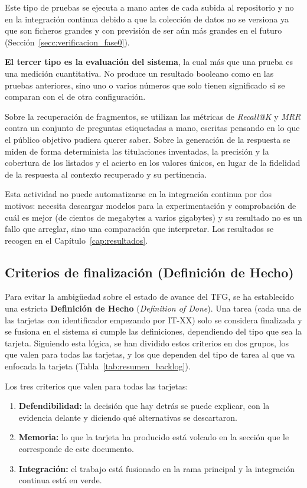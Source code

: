 Este tipo de pruebas se ejecuta a mano antes de cada subida al repositorio y no en la integración continua debido a que la colección de datos no se versiona ya que son ficheros grandes y con previsión de ser aún más grandes en el futuro (Sección~\ref{secc:verificacion_fase0}).

\textbf{El tercer tipo es la evaluación del sistema}, la cual más que una prueba es una medición cuantitativa. No produce un resultado booleano como en las pruebas anteriores, sino
uno o varios números que solo tienen significado si se comparan con el de otra configuración.

Sobre la recuperación de fragmentos, se utilizan las métricas de \textit{Recall@K} y \textit{MRR} contra un conjunto de preguntas etiquetadas a mano, escritas pensando en lo que el público objetivo pudiera querer saber.
Sobre la generación de la respuesta se miden de forma determinista las titulaciones inventadas, la precisión y la cobertura de los listados y el acierto en los valores únicos, en lugar de la fidelidad de la respuesta al contexto recuperado y su pertinencia.

Esta actividad no puede automatizarse en la integración continua por dos motivos: necesita descargar modelos para la experimentación y comprobación de cuál es mejor (de cientos de megabytes a varios gigabytes) y su
resultado no es un fallo que arreglar, sino una comparación que interpretar.
Los resultados se recogen en el Capítulo~\ref{cap:resultados}.


\subsection{Criterios de finalización (Definición de Hecho)}
\label{secc:dod}
Para evitar la ambigüedad sobre el estado de avance del TFG, se ha establecido una estricta \textbf{Definición de Hecho} (\textit{Definition of Done}). Una tarea (cada una de las tarjetas con identificador empezando por IT-XX) solo se considera finalizada y se fusiona en el sistema si cumple las definiciones, dependiendo del tipo que sea la tarjeta. Siguiendo esta lógica, se han dividido estos criterios en dos grupos, los que valen para todas las tarjetas, y los que dependen del tipo de tarea al que va enfocada la tarjeta (Tabla~\ref{tab:resumen_backlog}).

Los tres criterios que valen para todas las tarjetas:

\begin{enumerate}                                                                                  
  \item \textbf{Defendibilidad:} la decisión que hay detrás se puede explicar, con la evidencia delante y diciendo qué alternativas se descartaron.
  \item \textbf{Memoria:} lo que la tarjeta ha producido está volcado en la sección que le corresponde de este documento.
  \item \textbf{Integración:} el trabajo está fusionado en la rama principal y la integración continua está en verde.
\end{enumerate}

